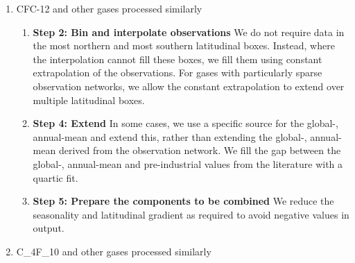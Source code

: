 \begin{enumerate}
{        \begin{enumerate}
            \item {
                \textbf{Step 4: Extend}
                The latitudinal gradient PC is extended back in time
                by doing an optimisation against ice core data from both the Southern and Northern Hemispheres,
                rather than based on a single ice core timeseries alone.
                We check that we maintain agreement with available ice core data in both the Northern and Southern hemispheres
                (based on the already extended latitudinal gradient)
                to within 0.1\% when extending the global-, annual-mean.
            }
        \end{enumerate}
    }
    \item {
        CFC-12 and other gases processed similarly

        \begin{enumerate}
            \item {
                \textbf{Step 2: Bin and interpolate observations}
                We do not require data in the most northern and most southern latitudinal boxes.
                Instead, where the interpolation cannot fill these boxes,
                we fill them using constant extrapolation of the observations.
                For gases with particularly sparse observation networks,
                we allow the constant extrapolation to extend over multiple latitudinal boxes.
            }
            \item {
                \textbf{Step 4: Extend}
                In some cases, we use a specific source for the global-, annual-mean
                and extend this, rather than extending the global-, annual-mean derived from the observation network.
                We fill the gap between the global-, annual-mean and pre-industrial values from the literature
                with a quartic fit.
            }
            \item {
                \textbf{Step 5: Prepare the components to be combined}
                We reduce the seasonality and latitudinal gradient
                as required to avoid negative values in output.
            }
        \end{enumerate}
    }
    \item {
        C_4F_10 and other gases processed similarly

}
\end{enumerate}
